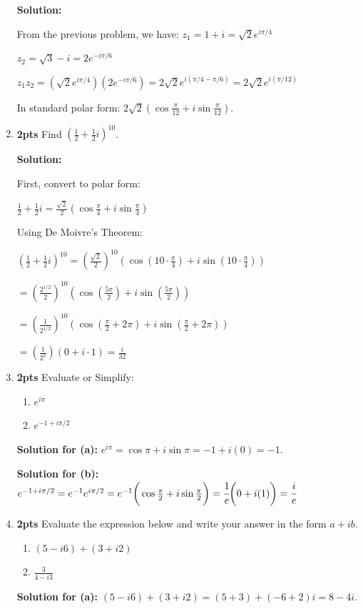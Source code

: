 \documentclass[nohyper,nobib,xcolor=dvipsnames,svgnames,x11names]{tufte-book}
\begin{document}
\begin{enumerate}
    \textbf{Solution:}
    
    From the previous problem, we have:
    $z_1 = 1+i = \sqrt{2}e^{i\pi/4}$
    
    $z_2 = \sqrt{3}-i = 2e^{-i\pi/6}$
    
    $z_1z_2 = (\sqrt{2}e^{i\pi/4})(2e^{-i\pi/6}) = 2\sqrt{2}e^{i(\pi/4-\pi/6)} = 2\sqrt{2}e^{i(\pi/12)}$
    
    In standard polar form: $2\sqrt{2}(\cos\frac{\pi}{12}+i\sin\frac{\pi}{12})$.

    \item \textbf{2pts} Find $(\frac{1}{2}+\frac{1}{2}i)^{10}$.

\textbf{Solution:}    
    
    First, convert to polar form:
    
    $\frac{1}{2}+\frac{1}{2}i = \frac{\sqrt{2}}{2}(\cos\frac{\pi}{4}+i\sin\frac{\pi}{4})$
    
    Using De Moivre's Theorem:
    
    $(\frac{1}{2}+\frac{1}{2}i)^{10} = (\frac{\sqrt{2}}{2})^{10}(\cos(10\cdot\frac{\pi}{4})+i\sin(10\cdot\frac{\pi}{4}))$
    
    $= (\frac{2^{1/2}}{2})^{10}(\cos(\frac{5\pi}{2})+i\sin(\frac{5\pi}{2}))$
    
    $= (\frac{1}{2^{1/2}})^{10}(\cos(\frac{\pi}{2}+2\pi)+i\sin(\frac{\pi}{2}+2\pi))$
    
    $= (\frac{1}{2^5})(0+i\cdot 1) = \frac{i}{32}$

    \item \textbf{2pts} Evaluate or Simplify:
    \begin{enumerate}
        \item $e^{i\pi}$
        \item $e^{-1+i\pi/2}$
    \end{enumerate}
    
    \textbf{Solution for (a):}
    $e^{i\pi} = \cos\pi+i\sin\pi = -1+i(0) = -1$.
    
    \textbf{Solution for (b):}
    $e^{-1+i\pi/2} = e^{-1}e^{i\pi/2} = e^{-1}\bigg( \cos{\tfrac{\pi}{2}} + i \sin{\tfrac{\pi}{2}} \bigg) = \cfrac{1}{e}\bigg(0 + i(1) \bigg)= \cfrac{i}{e}$

    \item \textbf{2pts} Evaluate the expression below and write your answer in the form $a+ib$.
    \begin{enumerate}
        \item $(5-i6)+(3+i2)$
        \item $\frac{3}{4-i3}$
    \end{enumerate}
    \textbf{Solution for (a):}
    $(5-i6)+(3+i2) = (5+3)+(-6+2)i = 8-4i$.
    

\end{enumerate}
\end{document}
